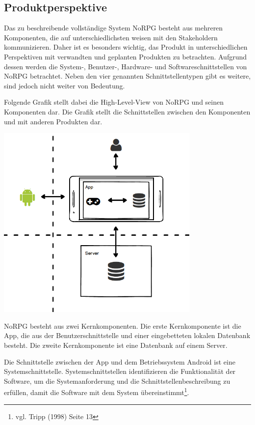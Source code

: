 	\subsection{Produktperspektive}
		Das zu beschreibende vollständige System NoRPG besteht aus mehreren Komponenten, die auf unterschiedlichsten weisen mit den Stakeholdern kommunizieren. Daher ist es besonders wichtig, das Produkt in unterschiedlichen Perspektiven mit verwandten und geplanten Produkten zu betrachten. Aufgrund dessen werden die System-, Benutzer-, Hardware- und Softwareschnittstellen von NoRPG betrachtet. Neben den vier genannten Schnittstellentypen gibt es weitere, sind jedoch nicht weiter von Bedeutung.
		
		Folgende Grafik stellt dabei die High-Level-View von NoRPG und seinen Komponenten dar. Die Grafik stellt die Schnittstellen zwischen den Komponenten und mit anderen Produkten dar.
		
		\begin{center}
			\includegraphics[width=10cm]{pics/HighLevelView.png}
		\end{center}
		
		NoRPG besteht aus zwei Kernkomponenten. Die erste Kernkomponente ist die App, die aus der Benutzerschnittstelle und einer eingebetteten lokalen Datenbank besteht. Die zweite Kernkomponente ist eine Datenbank auf einem Server.
		
		Die Schnittstelle zwischen der App und dem Betriebssystem Android ist eine Systemschnittstelle. Systemschnittstellen identifizieren die Funktionalität der Software, um die Systemanforderung und die Schnittstellenbeschreibung zu erfüllen, damit die Software mit dem System übereinstimmt\footnote{vgl. Tripp \cite{srsIEEE}(1998) Seite 13}.
		
